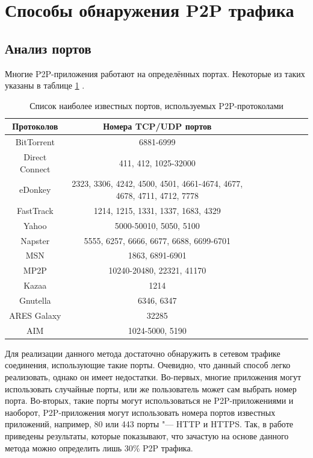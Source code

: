 \documentclass[bachelor, och, coursework]{SCWorks}
\begin{document}
\section{Способы обнаружения P2P трафика}
\subsection{Анализ портов}
Многие P2P-приложения работают на определённых портах. 
Некоторые из таких указаны в таблице \ref{table:p2p-ports} \cite{p2p-list}.

\begin{table}[H]
    \caption{Список наиболее известных портов, используемых P2P-протоколами}
    \label{table:p2p-ports}
    \begin{center}
    {\small
    \begin{tabular}{|c|c|c|c|c|c|c|c|c|}
        \hline
    Протоколов   & Номера TCP/UDP портов \\ \hline
    BitTorrent      & 6881-6999  \\ \hline
    Direct Connect  & 411, 412, 1025-32000  \\ \hline
    eDonkey         & 2323, 3306, 4242, 4500, 4501, 4661-4674, 4677, 4678, 4711, 4712, 7778  \\ \hline
    FastTrack       & 1214, 1215, 1331, 1337, 1683, 4329  \\ \hline
    Yahoo           & 5000-50010, 5050, 5100  \\ \hline
    Napster         & 5555, 6257, 6666, 6677, 6688, 6699-6701  \\ \hline
    MSN             & 1863, 6891-6901 \\ \hline
    MP2P            & 10240-20480, 22321, 41170  \\ \hline
    Kazaa           & 1214  \\ \hline
    Gnutella        & 6346, 6347  \\ \hline
    ARES Galaxy     & 32285  \\ \hline
    AIM             & 1024-5000, 5190  \\ \hline
    \end{tabular}
    }
    \end{center}
\end{table}

Для реализации данного метода достаточно обнаружить в сетевом трафике соединения, использующие такие порты.
Очевидно, что данный способ легко реализовать, однако он имеет недостатки. Во-первых, многие приложения могут
использовать случайные порты, или же пользователь может сам выбрать номер порта. Во-вторых, такие порты могут использоваться не P2P-приложениями и наоборот, P2P-приложения могут использовать номера портов известных приложений, например, 80 или 443 порты "--- HTTP и HTTPS. Так, в работе \cite{30percent} приведены результаты, которые показывают, что зачастую на основе данного метода можно определить лишь 30\% P2P трафика.
\end{document}

